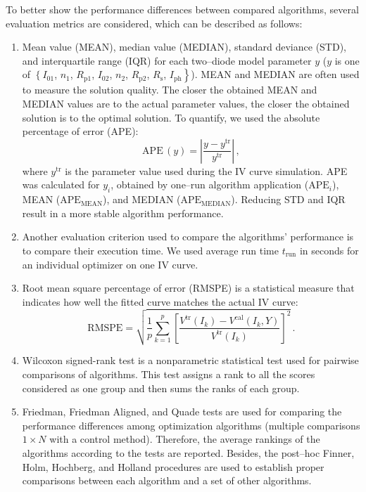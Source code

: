 \documentclass[a4paper,fleqn]{cas-sc}
\begin{document}
To better show the performance differences between compared algorithms,
several evaluation metrics are considered, which can be described as follows:
\begin{enumerate}[1.]
\item
Mean value (MEAN), median value (MEDIAN), standard deviance (STD), and interquartile range (IQR)
for each two--diode model parameter $y$
($y$ is one of $\left\{I_{01}\right.$, $n_1$, $R_\mathrm{p1}$, $I_{02}$, $n_2$, $R_\mathrm{p2}$, $R_\mathrm{s}$, $\left.I_\mathrm{ph}\right\}$).
MEAN and MEDIAN are often used to measure the solution quality.
The closer the obtained MEAN and MEDIAN values are to the actual parameter values,
the closer the obtained solution is to the optimal solution.
To quantify, we used the  absolute percentage of error (APE):
\begin{equation}
\label{eqAPE}
\mathrm{APE}\,(y)= \left| \frac{y-y^\mathrm{tr}}{y^\mathrm{tr}}\right|\,,
\end{equation}
where
$y^\mathrm{tr}$ is the parameter value used during the IV curve simulation.
APE was calculated for $y_i$, obtained by one--run algorithm application ($\mathrm{APE}_i$),
MEAN ($\mathrm{APE}_\mathrm{MEAN}$), and MEDIAN ($\mathrm{APE}_\mathrm{MEDIAN}$).
Reducing STD and IQR result in a more stable algorithm performance.

\item
Another evaluation criterion used to compare the algorithms’ performance is to compare their execution time.
We used average run time $t_\mathrm{run}$ in seconds for an
individual optimizer on one IV curve.

\item
Root mean square percentage of error (RMSPE) is a statistical measure that indicates
how well the fitted curve matches the actual IV curve:
\begin{equation}
\label{eqRMSPE}
\mathrm{RMSPE}= \sqrt{\frac{1}{p} \sum_{k=1}^p \left[\frac{V^\mathrm{tr}(I_k)-V^\mathrm{cal}(I_k,Y)}{V^\mathrm{tr}(I_k)} \right]^2}\,.
\end{equation}

\item
Wilcoxon signed-rank test is a nonparametric statistical test used for pairwise comparisons of algorithms.
This test assigns a rank to all the scores considered as one group and then sums the ranks of each group.

\item
Friedman, Friedman Aligned, and Quade tests are used for comparing the performance differences
among optimization algorithms
(multiple comparisons $1\times N$ with a control method).
Therefore, the average rankings of the algorithms according to the
tests are reported.
Besides, the post--hoc  Finner, Holm, Hochberg, and Holland procedures
are used to establish proper comparisons between each algorithm and a set of other algorithms.


\end{enumerate}
\end{document}
